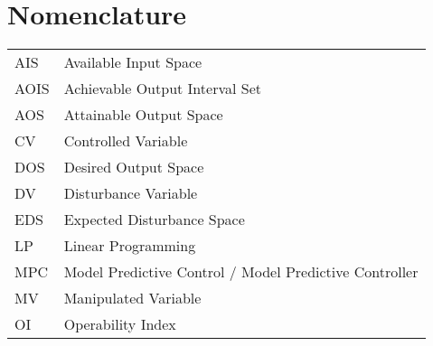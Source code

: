 \maketitle
\makecoverpage

\pagestyle{plain}
\thispagestyle{plain}



%

\tableofcontents
\newpage
\listoffigures{}
\newpage
\listoftables{}
\newpage
\chapter*{Nomenclature}

\begin{tabular}{ll}
  AIS & Available Input Space \\
  AOIS & Achievable Output Interval Set \citep{limaphd} \\
  AOS & Attainable Output Space \\
  CV  & Controlled Variable \\
  DOS & Desired Output Space \\
  DV  & Disturbance Variable \\
  EDS & Expected Disturbance Space \\
  LP  & Linear Programming \\
  MPC & Model Predictive Control / Model Predictive Controller \\
  MV  & Manipulated Variable \\
  OI  & Operability Index \citep{vinsonphd} \\
\end{tabular}

\newpage